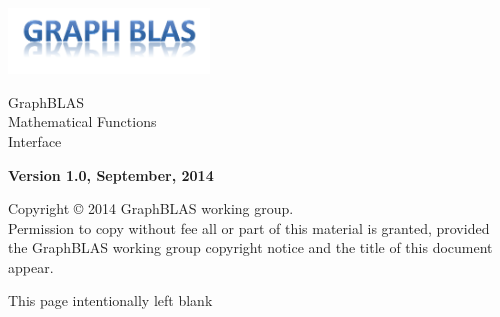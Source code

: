 
  \begin{titlepage}
    \begin{flushleft}
     \hspace{-6em} \includegraphics[width=0.4\textwidth]{graphblas-logo.png}
    \end{flushleft}

    \begin{adjustwidth}{-0.75in}{0in}
    \begin{center}
      \Huge
      \textsf{GraphBLAS\\Mathematical Functions \\Interface}

      \vspace{0.5in}\textsf{    }\vspace{-0.7in}
      \normalsize

      \vspace{1.0in}

      \textbf{Version 1.0, September, 2014}
    \end{center}
    \end{adjustwidth}

    \vspace{3.0in}

\begin{adjustwidth}{0pt}{1em}\setlength{\parskip}{0.25\baselineskip}%
Copyright © 2014 GraphBLAS working group.\\
Permission to copy without fee all or part of this material is granted,
provided the GraphBLAS working group copyright notice and
the title of this document appear.\end{adjustwidth}

  \end{titlepage}


\clearpage
\thispagestyle{empty}
\phantom{a}
This page intentionally left blank
\vfill

